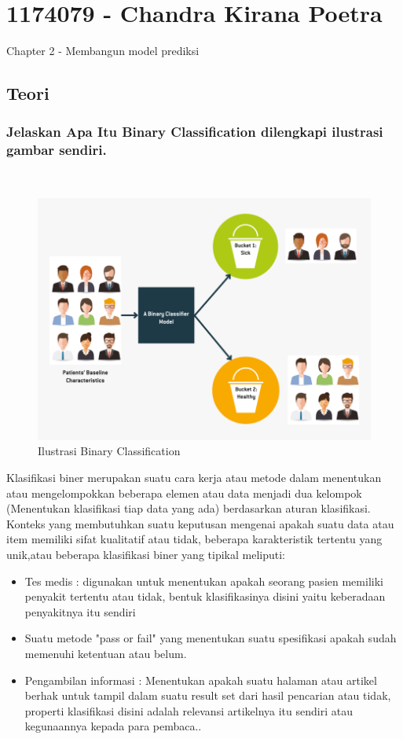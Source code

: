 \section{1174079 - Chandra Kirana Poetra}
Chapter 2 - Membangun model prediksi
\subsection{Teori}
\subsubsection{Jelaskan Apa Itu Binary Classification dilengkapi ilustrasi gambar sendiri.}
\hfill\\
\begin{figure}[H]
    \includegraphics[width=12cm]{figures/1174079/2/binaryclassification.png}
    \centering
    \caption{Ilustrasi Binary Classification}
\end{figure}

Klasifikasi biner merupakan suatu cara kerja atau metode dalam menentukan atau mengelompokkan beberapa elemen atau data menjadi dua kelompok (Menentukan klasifikasi tiap data yang ada) berdasarkan aturan klasifikasi. Konteks yang membutuhkan suatu keputusan mengenai apakah suatu data atau item memiliki sifat kualitatif atau tidak, beberapa karakteristik tertentu yang unik,atau beberapa klasifikasi biner yang tipikal meliputi:
\begin{itemize}
	\item Tes medis : digunakan untuk menentukan apakah seorang pasien memiliki penyakit tertentu atau tidak, bentuk klasifikasinya disini yaitu keberadaan penyakitnya itu sendiri
	\item Suatu metode "pass or fail" yang menentukan suatu spesifikasi apakah sudah memenuhi ketentuan atau belum.
	\item Pengambilan informasi : Menentukan apakah suatu halaman atau artikel berhak untuk tampil dalam suatu result set dari hasil pencarian atau tidak, properti klasifikasi disini adalah relevansi artikelnya itu sendiri atau kegunaannya kepada para pembaca..
\end{itemize}

